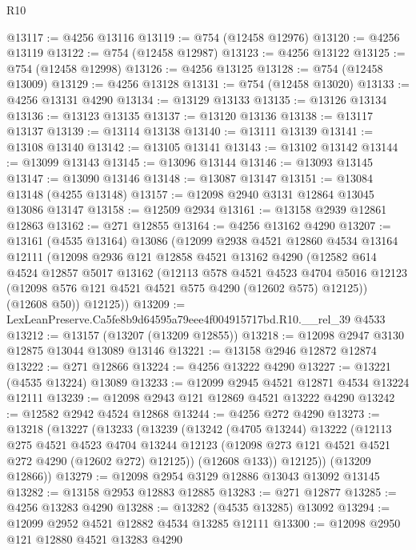 \begin{lexlean}{R10}
\begin{coremodule}
@13117 := @4256 @13116
@13119 := @754 (@12458 @12976)
@13120 := @4256 @13119
@13122 := @754 (@12458 @12987)
@13123 := @4256 @13122
@13125 := @754 (@12458 @12998)
@13126 := @4256 @13125
@13128 := @754 (@12458 @13009)
@13129 := @4256 @13128
@13131 := @754 (@12458 @13020)
@13133 := @4256 @13131 @4290
@13134 := @13129 @13133
@13135 := @13126 @13134
@13136 := @13123 @13135
@13137 := @13120 @13136
@13138 := @13117 @13137
@13139 := @13114 @13138
@13140 := @13111 @13139
@13141 := @13108 @13140
@13142 := @13105 @13141
@13143 := @13102 @13142
@13144 := @13099 @13143
@13145 := @13096 @13144
@13146 := @13093 @13145
@13147 := @13090 @13146
@13148 := @13087 @13147
@13151 := @13084 @13148 (@4255 @13148)
@13157 := @12098 @2940 @3131 @12864 @13045 @13086 @13147
@13158 := @12509 @2934
@13161 := @13158 @2939 @12861 @12863
@13162 := @271 @12855
@13164 := @4256 @13162 @4290
@13207 := @13161
    (@4535 @13164)
    @13086
    (@12099
      @2938
      @4521
      @12860
      @4534
      @13164
      @12111
      (@12098
        @2936
        @121
        @12858
        @4521
        @13162
        @4290
        (@12582
          @614
          @4524
          @12857
          @5017
          @13162
          (@12113
            @578
            @4521
            @4523
            @4704
            @5016
            @12123
            (@12098 @576 @121 @4521 @4521 @575 @4290 (@12602 @575) @12125))
          (@12608 @50))
        @12125))
@13209 := LexLeanPreserve.Ca5fe8b9d64595a79eee4f004915717bd.R10.__rel_39 @4533
@13212 := @13157 (@13207 (@13209 @12855))
@13218 := @12098 @2947 @3130 @12875 @13044 @13089 @13146
@13221 := @13158 @2946 @12872 @12874
@13222 := @271 @12866
@13224 := @4256 @13222 @4290
@13227 := @13221 (@4535 @13224) @13089
@13233 := @12099 @2945 @4521 @12871 @4534 @13224 @12111
@13239 := @12098 @2943 @121 @12869 @4521 @13222 @4290
@13242 := @12582 @2942 @4524 @12868
@13244 := @4256 @272 @4290
@13273 := @13218
    (@13227
      (@13233
        (@13239
          (@13242
            (@4705 @13244)
            @13222
            (@12113
              @275
              @4521
              @4523
              @4704
              @13244
              @12123
              (@12098 @273 @121 @4521 @4521 @272 @4290 (@12602 @272) @12125))
            (@12608 @133))
          @12125))
      (@13209 @12866))
@13279 := @12098 @2954 @3129 @12886 @13043 @13092 @13145
@13282 := @13158 @2953 @12883 @12885
@13283 := @271 @12877
@13285 := @4256 @13283 @4290
@13288 := @13282 (@4535 @13285) @13092
@13294 := @12099 @2952 @4521 @12882 @4534 @13285 @12111
@13300 := @12098 @2950 @121 @12880 @4521 @13283 @4290

\end{coremodule}
\end{lexlean}
